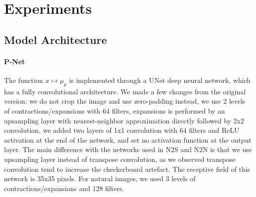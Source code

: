 \documentclass{article}
\begin{document}


\section{Experiments}
\subsection{Model Architecture}
\paragraph{P-Net}
The function $x\mapsto \mu_p$ is implemented through a UNet \cite{ronneberger2015u} deep neural network, which has a fully convolutional architecture.
We made a few changes from the original version: we do not crop the image and use zero-padding instead, we use 2 levels of contractions/expansions with 64 filters, expansions is performed by an upsampling layer with nearest-neighbor approximation directly followed by 2x2 convolution, we added two layers of 1x1 convolution with 64 filters and ReLU activation at the end of the network, and set no activation function at the output layer.
The main difference with the networks used in N2S and N2N is that we use upsampling layer instead of transpose convolution, as we observed transpose convolution tend to increase the checkerboard artefact.
The receptive field of this network is 35x35 pixels.
For natural images, we used 3 levels of contractions/expansions and 128 filters.
\end{document}

